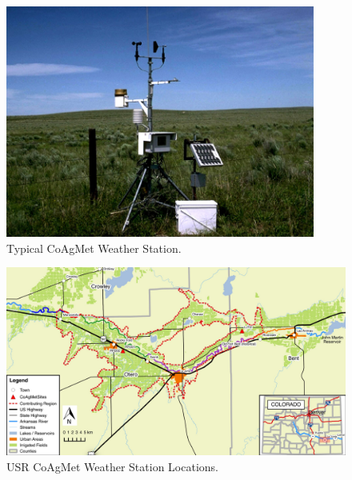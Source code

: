 \begin{linenumbers}
\begin{figure}[htbp]
\centering
	\includegraphics[width=4in]{Figures/Photo/CoagmetStation}
	\caption[Typical CoAgMet Weather Station.]{Typical CoAgMet Weather Station.}
	\label{pic:CoAgMetStation}
\end{figure}


	\begin{landscape}
	\begin{figure}[htbp]
		\includegraphics[scale=1]{Figures/Map/USRCoAgMet}
		\caption[USR CoAgMet Weather Station Locations.]{USR CoAgMet Weather Station Locations.}
		\label{map:USRCoAgMetLocations}	
	\end{figure}
	\end{landscape}


\end{linenumbers}
